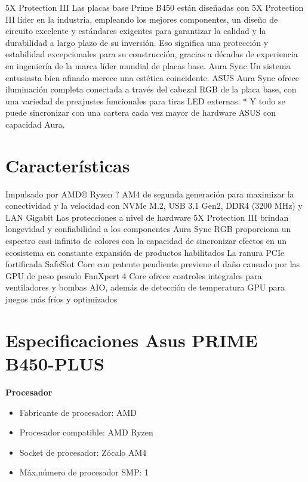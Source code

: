 \documentclass{article}
\begin{document}
5X Protection III
Las placas base Prime B450 están diseñadas con 5X Protection III líder en la industria, empleando los mejores componentes, un diseño de circuito excelente y estándares exigentes para garantizar la calidad y la durabilidad a largo plazo de su inversión. Eso significa una protección y estabilidad excepcionales para su construcción, gracias a décadas de experiencia en ingeniería de la marca líder mundial de placas base.
Aura Sync
Un sistema entusiasta bien afinado merece una estética coincidente. ASUS Aura Sync ofrece iluminación completa conectada a través del cabezal RGB de la placa base, con una variedad de preajustes funcionales para tiras LED externas. * Y todo se puede sincronizar con una cartera cada vez mayor de hardware ASUS con capacidad Aura.
\section{Características}

    Impulsado por AMD® Ryzen ? AM4 de segunda generación para maximizar la conectividad y la velocidad con NVMe M.2, USB 3.1 Gen2, DDR4 (3200 MHz) y LAN Gigabit
    Las protecciones a nivel de hardware 5X Protection III brindan longevidad y confiabilidad a los componentes
    Aura Sync RGB proporciona un espectro casi infinito de colores con la capacidad de sincronizar efectos en un ecosistema en constante expansión de productos habilitados
    La ranura PCIe fortificada SafeSlot Core con patente pendiente previene el daño causado por las GPU de peso pesado
    FanXpert 4 Core ofrece controles integrales para ventiladores y bombas AIO, además de detección de temperatura GPU para juegos más fríos y optimizados

\section{Especificaciones Asus PRIME B450-PLUS}

\textbf{Procesador}
    \begin{itemize}
      \item Fabricante de procesador: AMD
      \item  Procesador compatible: AMD Ryzen
      \item  Socket de procesador: Zócalo AM4
      \item   Máx.número de procesador SMP: 1
    \end{itemize}
\end{document}
